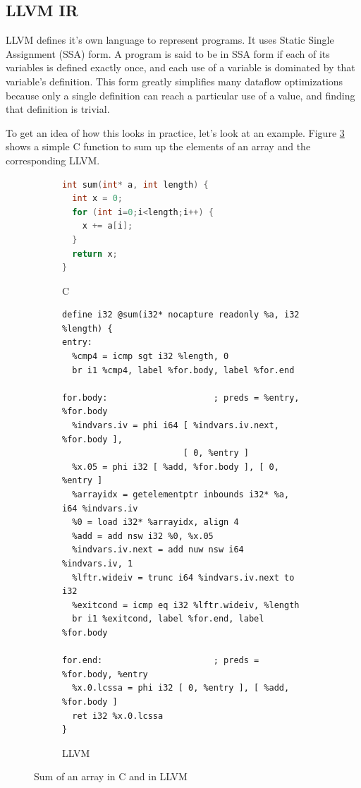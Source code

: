 \documentclass[a4paper,bibliography=totocnumbered,parskip,headsepline]{scrbook}
\begin{document}
\subsection{LLVM IR}
LLVM defines it's own language to represent programs.
It uses Static Single Assignment (SSA) form.\cite{alpern1988detecting,rosen1988global}
A program is said to be in SSA form if each of its variables is defined exactly once, and each use of a variable is dominated by that variable’s definition.
This form greatly simplifies many dataflow optimizations because only a single definition can reach a particular use of a value, and finding that definition is trivial.

To get an idea of how this looks in practice, let's look at an example.
Figure \ref{fig:sum} shows a simple C function to sum up the elements of an array and the corresponding LLVM.

\begin{figure}[H]
\begin{subfigure}{\textwidth}
\begin{lstlisting}[language=C]
int sum(int* a, int length) {
  int x = 0;
  for (int i=0;i<length;i++) {
    x += a[i];
  }
  return x;
}
\end{lstlisting}
\caption{C}
\label{fig:sumc}
\end{subfigure}

\begin{subfigure}{\textwidth}
\begin{lstlisting}
define i32 @sum(i32* nocapture readonly %a, i32 %length) {
entry:
  %cmp4 = icmp sgt i32 %length, 0
  br i1 %cmp4, label %for.body, label %for.end

for.body:                     ; preds = %entry, %for.body
  %indvars.iv = phi i64 [ %indvars.iv.next, %for.body ],
                        [ 0, %entry ]
  %x.05 = phi i32 [ %add, %for.body ], [ 0, %entry ]
  %arrayidx = getelementptr inbounds i32* %a, i64 %indvars.iv
  %0 = load i32* %arrayidx, align 4
  %add = add nsw i32 %0, %x.05
  %indvars.iv.next = add nuw nsw i64 %indvars.iv, 1
  %lftr.wideiv = trunc i64 %indvars.iv.next to i32
  %exitcond = icmp eq i32 %lftr.wideiv, %length
  br i1 %exitcond, label %for.end, label %for.body

for.end:                      ; preds = %for.body, %entry
  %x.0.lcssa = phi i32 [ 0, %entry ], [ %add, %for.body ]
  ret i32 %x.0.lcssa
}
\end{lstlisting}
\caption{LLVM}
\label{fig:sumll}
\end{subfigure}
\caption{Sum of an array in C and in LLVM}
\label{fig:sum}
\end{figure}
\end{document}
